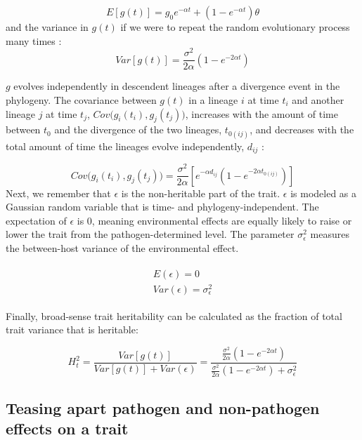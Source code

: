 \documentclass[11pt]{article}
\begin{document}
\begin{linenumbers}
\begin{equation}
   E[g(t)] = g_0e^{-\alpha t} + (1 - e^{-\alpha t})\theta \label{eq:OUmean}
\end{equation}
and the variance in $g(t)$ if we were to repeat the random evolutionary process many times \citep{Butler2004}:
\begin{equation}
    Var[g(t)] = \frac{\sigma^2}{2\alpha}(1 - e^{-2\alpha t}) \label{eq:OUVar}
\end{equation}

$g$ evolves independently in descendent lineages after a divergence event in the phylogeny. The covariance between $g(t)$ in a lineage $i$ at time $t_i$ and another lineage $j$ at time $t_j$, $Cov\big(g_{i}(t_i), g_{j}(t_j)\big)$, increases with the amount of time between $t_0$ and the divergence of the two lineages, $t_{0(ij)}$, and decreases with the total amount of time the lineages evolve independently, $d_{ij}$ \citep{Butler2004}: 

\begin{equation}
	Cov\big(g_{i}(t_i), g_{j}(t_j)\big) = \frac{\sigma^2}{2\alpha}[e^{-\alpha d_{ij}}(1 - e^{-2\alpha t_{0(ij)}})]
	\label{eq:OUcov}
\end{equation}
Next, we remember that $\epsilon$ is the non-heritable part of the trait. $\epsilon$ is modeled as a Gaussian random variable that is time- and phylogeny-independent. The expectation of $\epsilon$ is 0, meaning environmental effects are equally likely to raise or lower the trait from the pathogen-determined level. The parameter $\sigma_\epsilon^2$ measures the between-host variance of the environmental effect.

\begin{align}
\begin{split}
	E(\epsilon) = 0 \\
	Var(\epsilon) = \sigma^2_\epsilon
\end{split}
\end{align}

Finally, broad-sense trait heritability can be calculated as the fraction of total trait variance that is heritable:

\begin{equation}
	H^2_{t} = \frac{Var[g(t)]}{Var[g(t)] + Var(\epsilon)} = \frac{\frac{\sigma^2}{2\alpha}(1 - e^{-2\alpha t})}{\frac{\sigma^2}{2\alpha}(1 - e^{-2\alpha t}) + \sigma^2_\epsilon}
	\label{eq:POUMM-H2}
\end{equation}

\subsection*{Teasing apart pathogen and non-pathogen effects on a trait}


\end{linenumbers}
\end{document}
